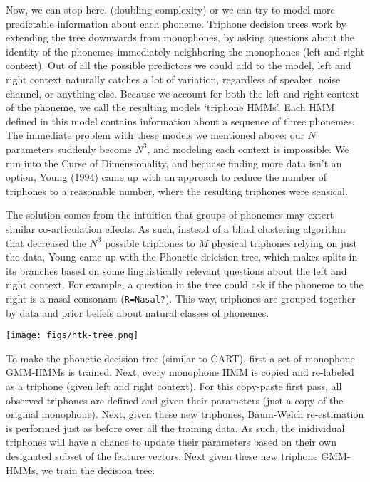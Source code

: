 \documentclass[10pt,a4paper]{article}
\begin{document}

Now, we can stop here, (doubling complexity) or we can try to model more predictable information about each phoneme. Triphone decision trees work by extending the tree downwards from monophones, by asking questions about the identity of the phonemes immediately neighboring the monophones (left and right context). Out of all the possible predictors we could add to the model, left and right context naturally catches a lot of variation, regardless of speaker, noise channel, or anything else. Because we account for both the left and right context of the phoneme, we call the resulting models `triphone HMMs'. Each HMM defined in this model contains information about a sequence of three phonemes. The immediate problem with these models we mentioned above: our $N$ parameters suddenly become $N^3$, and modeling each context is impossible. We run into the Curse of Dimensionality, and becuase finding more data isn't an option, Young (1994) came up with an approach to reduce the number of triphones to a reasonable number, where the resulting triphones were sensical.

The solution comes from the intuition that groups of phonemes may extert similar co-articulation effects. As such, instead of a blind clustering algorithm that decreased the $N^3$ possible triphones to $M$ physical triphones relying on just the data, Young came up with the Phonetic deicision tree, which makes splits in its branches based on some linguistically relevant questions about the left and right context. For example, a question in the tree could ask if the phoneme to the right is a nasal consonant (\texttt{R=Nasal?}). This way, triphones are grouped together by data and prior beliefs about natural classes of phonemes.

\begin{center}
  \texttt{[image: figs/htk-tree.png]}
\end{center}

To make the phonetic decision tree (similar to CART), first a set of monophone GMM-HMMs is trained. Next, every monophone HMM is copied and re-labeled as a triphone (given left and right context). For this copy-paste first pass, all observed triphones are defined and given their parameters (just a copy of the original monophone). Next, given these new triphones, Baum-Welch re-estimation is performed just as before over all the training data. As such, the inidividual triphones will have a chance to update their parameters based on their own designated subset of the feature vectors. Next given these new triphone GMM-HMMs, we train the decision tree.
\end{document}
